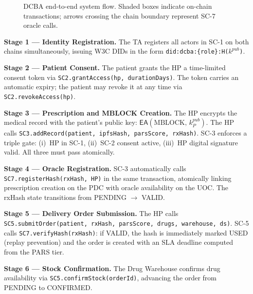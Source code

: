 \documentclass[sigplan,screen,review=false]{acmart}
\begin{document}
\begin{figure}[h]
  \centering
  \caption{DCBA end-to-end system flow. Shaded boxes indicate
    on-chain transactions; arrows crossing the chain boundary represent
    SC-7 oracle calls.}
  \label{fig:flow}
\end{figure}

\textbf{Stage 1 --- Identity Registration.} The TA registers all actors
in SC-1 on both chains simultaneously, issuing W3C DIDs in the form
\texttt{did:dcba:\{role\}:H($k^{pub}$)}.

\textbf{Stage 2 --- Patient Consent.} The patient grants the HP a
time-limited consent token via \texttt{SC2.grantAccess(hp, durationDays)}.
The token carries an automatic expiry; the patient may revoke it at
any time via \texttt{SC2.revokeAccess(hp)}.

\textbf{Stage 3 --- Prescription and MBLOCK Creation.} The HP encrypts
the medical record with the patient's public key: $\mathsf{EA}(\text{MBLOCK},\, k^{pub}_P)$.
The HP calls \texttt{SC3.addRecord(patient, ipfsHash, parsScore, rxHash)}.
SC-3 enforces a triple gate: (i)~HP in SC-1, (ii)~SC-2 consent active,
(iii)~HP digital signature valid. All three must pass atomically.

\textbf{Stage 4 --- Oracle Registration.} SC-3 automatically calls
\texttt{SC7.registerHash(rxHash, HP)} in the same transaction, atomically
linking prescription creation on the PDC with oracle availability on
the UOC. The rxHash state transitions from PENDING $\to$ VALID.

\textbf{Stage 5 --- Delivery Order Submission.} The HP calls
\texttt{SC5.submitOrder(patient, rxHash, parsScore, drugs, warehouse, ds)}.
SC-5 calls \texttt{SC7.verifyHash(rxHash)}: if VALID, the hash is
immediately marked USED (replay prevention) and the order is created with
an SLA deadline computed from the PARS tier.

\textbf{Stage 6 --- Stock Confirmation.} The Drug Warehouse confirms
drug availability via \texttt{SC5.confirmStock(orderId)}, advancing the
order from PENDING to CONFIRMED.
\end{document}
